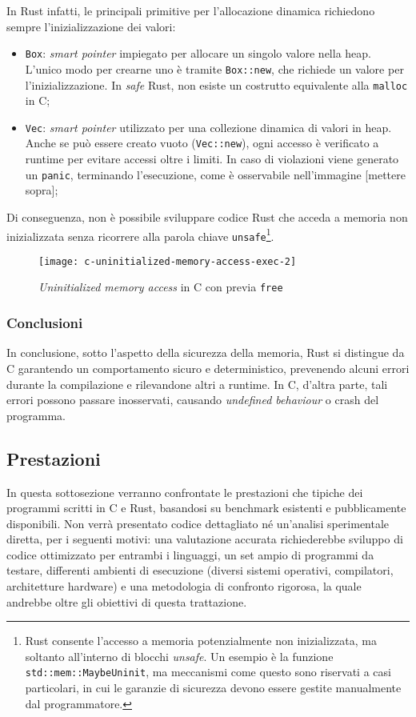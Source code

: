 In Rust infatti, le principali primitive per l'allocazione dinamica richiedono sempre l'inizializzazione dei valori:
\begin{itemize}
    \item \texttt{Box}: \textit{smart pointer} impiegato per allocare un singolo valore nella heap. L'unico modo per crearne uno è tramite \texttt{Box::new}, che richiede un valore per l'inizializzazione. In \textit{safe} Rust, non esiste un costrutto equivalente alla \texttt{malloc} in C;\ 
    \item \texttt{Vec}: \textit{smart pointer} utilizzato per una collezione dinamica di valori in heap. Anche se può essere creato vuoto (\texttt{Vec::new}), ogni accesso è verificato a runtime per evitare accessi oltre i limiti. In caso di violazioni viene generato un \texttt{panic}, terminando l'esecuzione, come è osservabile nell'immagine [mettere sopra];
\end{itemize}
Di conseguenza, non è possibile sviluppare codice Rust che acceda a memoria non inizializzata senza ricorrere alla parola chiave \texttt{unsafe}\footnote{Rust consente l'accesso a memoria potenzialmente non inizializzata, ma soltanto all'interno di blocchi \textit{unsafe}. Un esempio è la funzione \texttt{std::mem::MaybeUninit}, ma meccanismi come questo sono riservati a casi particolari, in cui le garanzie di sicurezza devono essere gestite manualmente dal programmatore.}.
\begin{figure}[htbp]
\begin{center}
    \texttt{[image: c-uninitialized-memory-access-exec-2]}
    \caption{\textit{Uninitialized memory access} in C con previa \texttt{free}}\label{c:uninitialized-memory-access-exec-2}
    \end{center}
\end{figure}

\subsubsection{Conclusioni}
In conclusione, sotto l'aspetto della sicurezza della memoria, Rust si distingue da C garantendo un comportamento sicuro e deterministico, prevenendo
alcuni errori durante la compilazione e rilevandone altri a runtime. In C, d'altra parte, tali errori possono passare inosservati, causando
\textit{undefined behaviour} o crash del programma.

\subsection{Prestazioni}
In questa sottosezione verranno confrontate le prestazioni che tipiche dei programmi scritti in C e Rust, basandosi
su benchmark esistenti e pubblicamente disponibili.
Non verrà presentato codice dettagliato né un'analisi sperimentale diretta, per i seguenti motivi: una valutazione accurata
richiederebbe sviluppo di codice ottimizzato per entrambi i linguaggi, un set ampio di programmi da testare, differenti ambienti di esecuzione (diversi sistemi operativi, compilatori, architetture hardware) e una metodologia
di confronto rigorosa, la quale andrebbe oltre gli obiettivi di questa trattazione.

